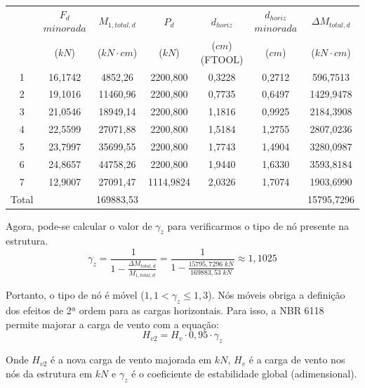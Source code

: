 \begin{table}[H]
\centering
\begin{tabular}{c|c|c|ccc|c}
\hline
 & $F_d$ $minorada$ & $M_{1, total, d}$ & \multicolumn{1}{c|}{$P_d$} & \multicolumn{1}{c|}{$d_{horiz}$} & $d_{horiz}$ $minorada$ & $\Delta M_{total, d}$ \\
 & ($kN$) & ($kN\cdot cm$) & \multicolumn{1}{c|}{($kN$)} & \multicolumn{1}{c|}{($cm$) (FTOOL)} & ($cm$) & ($kN\cdot cm$) \\ \hline
1 & 16,1742 & 4852,26 & \multicolumn{1}{c|}{2200,800} & \multicolumn{1}{c|}{0,3228} & 0,2712 & 596,7513 \\
2 & 19,1016 & 11460,96 & \multicolumn{1}{c|}{2200,800} & \multicolumn{1}{c|}{0,7735} & 0,6497 & 1429,9478 \\
3 & 21,0546 & 18949,14 & \multicolumn{1}{c|}{2200,800} & \multicolumn{1}{c|}{1,1816} & 0,9925 & 2184,3908 \\
4 & 22,5599 & 27071,88 & \multicolumn{1}{c|}{2200,800} & \multicolumn{1}{c|}{1,5184} & 1,2755 & 2807,0236 \\
5 & 23,7997 & 35699,55 & \multicolumn{1}{c|}{2200,800} & \multicolumn{1}{c|}{1,7743} & 1,4904 & 3280,0987 \\
6 & 24,8657 & 44758,26 & \multicolumn{1}{c|}{2200,800} & \multicolumn{1}{c|}{1,9440} & 1,6330 & 3593,8184 \\
7 & 12,9007 & 27091,47 & \multicolumn{1}{c|}{1114,9824} & \multicolumn{1}{c|}{2,0326} & 1,7074 & 1903,6990 \\ \hline
Total &  & 169883,53 &  &  &  & 15795,7296 \\ \cline{1-1} \cline{3-3} \cline{7-7} 
\end{tabular}
\end{table}

Agora, pode-se calcular o valor de $\gamma_z$ para verificarmos o tipo de nó presente na estrutura.
$$\gamma_z=\frac{1}{1-\frac{\Delta M_{total, d}}{M_{1, total, d}}}=\frac{1}{1-\frac{15795,7296\;kN}{169883,53\;kN}}\approx1,1025$$

Portanto, o tipo de nó é móvel ($1,1<\gamma_z\leqslant1,3$). Nós móveis obriga a definição dos efeitos de 2ª ordem para as cargas horizontais. Para isso, a NBR 6118 permite majorar a carga de vento com a equação:
\begin{equation}H_{v2}=H_v\cdot0,95\cdot\gamma_z\end{equation}

Onde $H_{v2}$ é a nova carga de vento majorada em $kN$, $H_v$ é a carga de vento nos nós da estrutura em $kN$ e $\gamma_z$ é o coeficiente de estabilidade global (adimensional).

